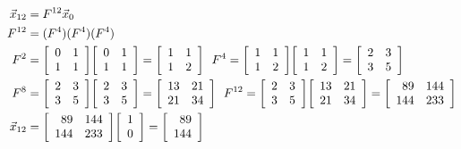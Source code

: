 \documentclass{letter}
\newcommand{\Vn}[1]{\vec{#1}}
\newcommand{\?}{\stackrel{?}{=}}
\newcommand\Ans[2][]{%
   \leavevmode\noindent
   {
       \begin{mdframed}[backgroundcolor=blue!10]
       #2
       \end{mdframed}
   }
}
\newenvironment{Mat}[1]{%
  \left[\begin{array}{*{#1}{r}}
}{%
  \end{array}\right]
}
\begin{document}
\begin{enumerate}
\begin{enumerate}[label=(\alph*)]
{    }
    \Ans{
       \begin{align*}
           \Vn{x}_{12} &= F^{12}\Vn{x}_0 \\
           F^{12}    &= (F^4)(F^4)(F^4) \\
           F^2 &= \begin{Mat}{2} 0 & 1 \\ 1 & 1 \end{Mat}\begin{Mat}{2} 0 & 1 \\ 1 & 1 \end{Mat}
                = \begin{Mat}{2} 1 & 1 \\ 1 & 2 \end{Mat} ~~ 
           F^4  = \begin{Mat}{2} 1 & 1 \\ 1 & 2 \end{Mat}\begin{Mat}{2} 1 & 1 \\ 1 & 2 \end{Mat}
                = \begin{Mat}{2} 2 & 3 \\ 3 & 5 \end{Mat} \\
           F^8 &= \begin{Mat}{2} 2 & 3 \\ 3 & 5 \end{Mat}\begin{Mat}{2} 2 & 3 \\ 3 & 5 \end{Mat}
                = \begin{Mat}{2} 13 & 21 \\ 21 & 34 \end{Mat} ~~
           F^{12}=\begin{Mat}{2} 2 & 3 \\ 3 & 5 \end{Mat}\begin{Mat}{2} 13 & 21 \\ 21 & 34 \end{Mat}
                 =\begin{Mat}{2} 89 & 144 \\ 144 & 233 \end{Mat}\\
           \Vn{x}_{12} &= \begin{Mat}{2} 89 & 144 \\ 144 & 233 \end{Mat}\begin{Mat}{1} 1 \\ 0 \end{Mat} = \begin{Mat}{1} 89 \\ 144 \end{Mat}

\end{align*}}
\end{enumerate}
\end{enumerate}
\end{document}
